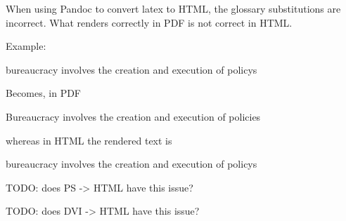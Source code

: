 When using Pandoc to convert latex to HTML, the glossary substitutions are incorrect. 
What renders correctly in PDF is not correct in HTML. 

Example:

\Gls{bureaucracy} involves the creation and execution of \glspl{policy}

Becomes, in PDF

Bureaucracy involves the creation and execution of policies

whereas in HTML the rendered text is

bureaucracy involves the creation and execution of policys


TODO: does PS -> HTML have this issue?

TODO: does DVI -> HTML have this issue?